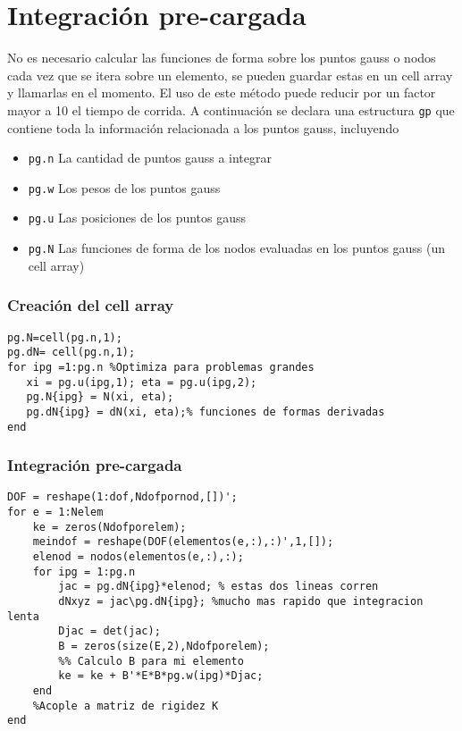 \section{Integración pre-cargada}
No es necesario calcular las funciones de forma sobre los puntos gauss o nodos cada vez que se itera sobre un elemento, se pueden guardar estas en un cell array y llamarlas en el momento. El uso de este método puede reducir por un factor mayor a 10 el tiempo de corrida. A continuación se declara una estructura \verb|gp| que contiene toda la información relacionada a los puntos gauss, incluyendo

\begin{itemize}
	\item \verb|pg.n| La cantidad de puntos gauss a integrar
	\item \verb|pg.w| Los pesos de los puntos gauss
	\item \verb|pg.u| Las posiciones de los puntos gauss
	\item \verb|pg.N| Las funciones de forma de los nodos evaluadas en los puntos gauss (un cell array)
\end{itemize}

\subsubsection*{Creación del cell array}
\begin{lstlisting}[caption = {Creación de struct relacionada a los puntos de Gauss.}]
pg.N=cell(pg.n,1);
pg.dN= cell(pg.n,1);
for ipg =1:pg.n %Optimiza para problemas grandes 
   xi = pg.u(ipg,1); eta = pg.u(ipg,2);
   pg.N{ipg} = N(xi, eta);
   pg.dN{ipg} = dN(xi, eta);% funciones de formas derivadas
end
\end{lstlisting}

\subsubsection*{Integración pre-cargada}

\begin{lstlisting}[caption = {Aplicación del método de integración pre-cargada.}]
DOF = reshape(1:dof,Ndofpornod,[])';
for e = 1:Nelem
    ke = zeros(Ndofporelem);
    meindof = reshape(DOF(elementos(e,:),:)',1,[]);
    elenod = nodos(elementos(e,:),:);
    for ipg = 1:pg.n
        jac = pg.dN{ipg}*elenod; % estas dos lineas corren
        dNxyz = jac\pg.dN{ipg}; %mucho mas rapido que integracion lenta
        Djac = det(jac);
        B = zeros(size(E,2),Ndofporelem);
        %% Calculo B para mi elemento
        ke = ke + B'*E*B*pg.w(ipg)*Djac;
    end
    %Acople a matriz de rigidez K
end
\end{lstlisting}

